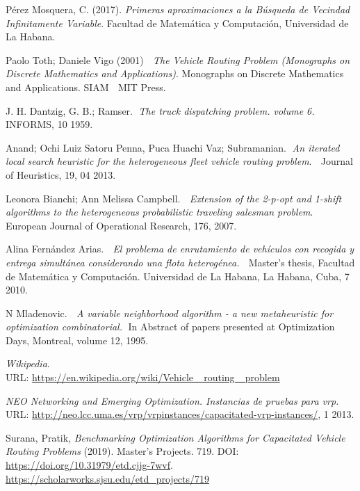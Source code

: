 \documentclass[a4paper,10pt,twocolumn]{article}
\begin{document}
\begin{thebibliography}{99}
	 Pérez Mosquera, C. (2017).	\emph{Primeras aproximaciones 
	a la Búsqueda de Vecindad Infinitamente Variable}. Facultad de Matemática y Computación, 
	Universidad de La Habana.
	
	 Paolo Toth; Daniele Vigo (2001) $\;$ \textit{The Vehicle Routing 
	Problem (Monographs on Discrete Mathematics and Applications)}. Monographs on 
	Discrete Mathematics and Applications. SIAM $\;$
	MIT Press.
	
	 J. H. Dantzig, G. B.; Ramser. $\;$\textit{The truck dispatching 
	problem. volume 6.} $\;$ INFORMS, 10 1959.
	
	 Anand; Ochi Luiz Satoru Penna, Puca Huachi Vaz; Subramanian.$\;$ 
	\textit{An iterated local search heuristic for the heterogeneous fleet vehicle 
	routing problem}. $\;$ Journal of Heuristics, 19, 04 2013.

	 Leonora Bianchi; Ann Melissa Campbell. $\;$ \textit{Extension of 
	the 2-p-opt and 1-shift algorithms to the heterogeneous probabilistic traveling 
	salesman problem}.$\;$ European Journal of Operational Research, 176, 2007.

	  Alina Fernández Arias. $\;$ \textit{El problema de enrutamiento de 
	vehículos con recogida y entrega simultánea considerando una flota heterogénea.} 
	$\;$ Master’s thesis, Facultad de Matemática y Computación. Universidad de La Habana, 
	La Habana, Cuba, 7 2010.
	
	 N Mladenovic. $\;$ \textit{A variable neighborhood algorithm - a new 
	metaheuristic for optimization combinatorial.}$\;$ In Abstract of papers presented at 
	Optimization Days, Montreal, volume 12, 1995.

	 \textit{Wikipedia}.\\
	URL: \href{https://en.wikipedia.org/wiki/Vehicle\_ routing\_ problem}
	{https://en.wikipedia.org/wiki/Vehicle\_ routing\_ problem}
	
	 \textit{NEO Networking and Emerging Optimization.	Instancias de pruebas
	para vrp.} \\
	URL: \href{http://neo.lcc.uma.es/vrp/vrpinstances/capacitated-vrp-instances/}
	{http://neo.lcc.uma.es/vrp/vrpinstances/capacitated-vrp-instances/}, 1 2013.

	 Surana, Pratik, \textit{Benchmarking Optimization Algorithms for Capacitated Vehicle Routing Problems} (2019). Master's Projects. 719.
	DOI: \href{https://doi.org/10.31979/etd.cjjg-7wvf}{https://doi.org/10.31979/etd.cjjg-7wvf}.
	\href{https://scholarworks.sjsu.edu/etd\_projects/719}{https://scholarworks.sjsu.edu/etd\_projects/719}
\end{thebibliography}


\label{end}
\end{document}
